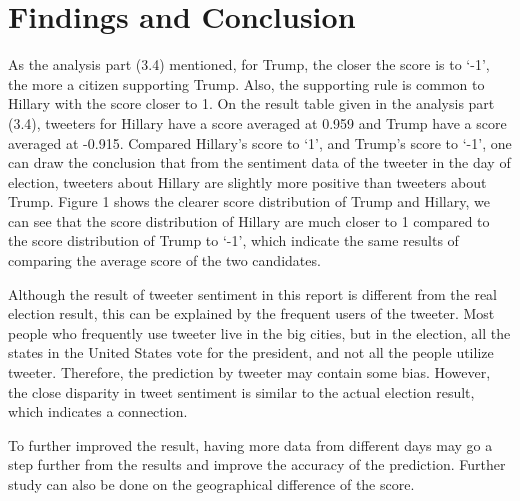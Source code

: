 \documentclass[12pt,a4paper]{article}
\begin{document}
\section{Findings and Conclusion}

  As the analysis part (3.4) mentioned, for Trump, the closer the score is to ‘-1’, the more a citizen supporting Trump. Also, the supporting rule is common to Hillary with the score closer to 1. On the result table given in the analysis part (3.4), tweeters for Hillary have a score averaged at 0.959 and Trump have a score averaged at -0.915. Compared Hillary’s score to ‘1’, and Trump’s score to ‘-1’, one can draw the conclusion that from the sentiment data of the tweeter in the day of election, tweeters about Hillary are slightly more positive than tweeters about Trump. Figure 1 shows the clearer score distribution of Trump and Hillary, we can see that the score distribution of Hillary are much closer to 1 compared to the score distribution of Trump to ‘-1’, which indicate the same results of comparing the average score of the two candidates.

  Although the result of tweeter sentiment in this report is different from the real election result, this can be explained by the frequent users of the tweeter. Most people who frequently use tweeter live in the big cities, but in the election, all the states in the United States vote for the president, and not all the people utilize tweeter. Therefore, the prediction by tweeter may contain some bias. However, the close disparity in tweet sentiment is similar to the actual election result, which indicates a connection.

  To further improved the result, having more data from different days may go a step further from the results and improve the accuracy of the prediction. Further study can also be done on the geographical difference of the score. 


  
  
\end{document}
